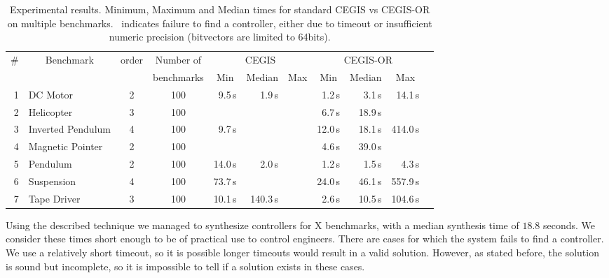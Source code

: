 \documentclass[sigconf]{llncs}
\newcommand{\xmark}{\ding{55}}
\begin{document}
\begin{table}
\centering
\footnotesize
%
\begin{tabular}{| r | l | c | c | r | r | r | r | r | r | r |}
%
\hline
\# & \multicolumn{1}{|c|}{Benchmark} & \multicolumn{1}{|c|}{order} & \multicolumn{1}{|c|}{Number of} & \multicolumn{3}{|c|}{CEGIS} & \multicolumn{3}{|c|}{CEGIS-OR} \\
   &                                 & & \multicolumn{1}{|c|}{benchmarks}  & \multicolumn{1}{|c|}{Min} & \multicolumn{1}{|c|}{Median} & \multicolumn{1}{|c|}{Max} & \multicolumn{1}{|c|}{Min} & \multicolumn{1}{|c|}{Median} & \multicolumn{1}{|c|}{Max}\\\hline
1  & DC Motor          & 2 & 100 & 9.5\,s & 1.9\,s& \xmark& 1.2\,s &   3.1\,s &   14.1\,s\\
2  & Helicopter        & 3  & 100 & \xmark & \xmark & \xmark & 6.7\,s  &   18.9\,s & \xmark\\
3  & Inverted Pendulum & 4 & 100 &   9.7\,s & \xmark &\xmark & 12.0\,s  &  18.1\,s &  414.0\,s\\
4  & Magnetic Pointer  & 2  & 100 & \xmark & \xmark & \xmark& 4.6\,s  &  39.0\,s &  \xmark \\
5  & Pendulum          & 2 & 100 & 14.0\,s & 2.0\,s & \xmark&1.2\,s  &   1.5\,s &   4.3\,s\\
6  & Suspension        & 4 & 100 & 73.7\,s& \xmark & \xmark &24.0\,s  &   46.1\,s &  557.9\,s\\
7  & Tape Driver       & 3 & 100 & 10.1\,s& 140.3\,s & \xmark &2.6\,s  &   10.5\,s &   104.6\,s\\
\hline
%
\end{tabular}
\vspace{0.05in}
\caption{\label{tab:cegis_results}
Experimental results. Minimum, Maximum and Median times for standard CEGIS vs CEGIS-OR on multiple benchmarks. \xmark~indicates failure to find a controller, either due to timeout or insufficient numeric precision (bitvectors are limited to 64bits).}
\end{table}

Using the described technique we managed to synthesize controllers for X benchmarks, with a median synthesis time of $18.8$ seconds.
We consider these times short enough to be of practical use to control engineers.
There are cases for which the system fails to find a controller.  We use a
relatively short timeout, so it is possible longer timeouts would result in a
valid solution. However, as stated before, the solution is sound but incomplete,
so it is impossible to tell if a solution exists in these cases. 
\end{document}
